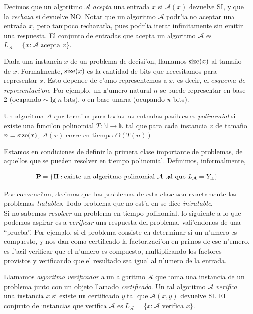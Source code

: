 Decimos que un algoritmo $\mathcal{A}$ \textit{acepta} una entrada $x$ si $\mathcal{A}(x)$ devuelve SI, y que la \textit{rechaza} si devuelve NO. Notar que un algoritmo $\mathcal{A}$ podr'ia no aceptar una entrada $x$, pero tampoco rechazarla, pues podr'ia iterar infinitamente sin emitir una respuesta. El conjunto de entradas que acepta un algoritmo $\mathcal{A}$ es $L_{\mathcal{A}} = \{x : \mathcal{A} \text{ acepta } x\}$.

Dada una instancia $x$ de un problema de decisi'on, llamamos $\textnormal{size}(x)$ al tama\~no de $x$. Formalmente, $\textnormal{size}(x)$ es la cantidad de bits que necesitamos para representar $x$. Esto depende de c'omo representemos a $x$, es decir, el \textit{esquema de representaci'on}. Por ejemplo, un n'umero natural $n$ se puede representar en base 2 (ocupando $\sim \lg n$ bits), o en base unaria (ocupando $n$ bits).

Un algoritmo $\mathcal{A}$ que termina para todas las entradas posibles es \textit{polinomial} si existe una funci'on polinomial $T : \mathbb{N} \to \mathbb{N}$ tal que para cada instancia $x$ de tama\~no $n = \textnormal{size}(x)$, $\mathcal{A}(x)$ corre en tiempo $O(T(n))$.

Estamos en condiciones de definir la primera clase importante de problemas, de aquellos que se pueden resolver en tiempo polinomial. Definimos, informalmente,

\[\textnormal{\textbf{P}} = \{\Pi : \text{existe un algoritmo polinomial } \mathcal{A} \text{ tal que } L_{\mathcal{A}} = Y_{\Pi}\}\]

\noindent
Por convenci'on, decimos que los problemas de esta clase son exactamente los problemas \textit{tratables}. Todo problema que no est'a en  se dice \textit{intratable}.\\

Si no sabemos \textit{resolver} un problema en tiempo polinomial, lo siguiente a lo que podemos aspirar es a \textit{verificar} una respuesta del problema, vali'endonos de una ``prueba''. Por ejemplo, si el problema consiste en determinar si un n'umero es compuesto, y nos dan como certificado la factorizaci'on en primos de ese n'umero, es f'acil verificar que el n'umero es compuesto, multiplicando los factores provistos y verificando que el resultado sea igual al n'umero de la entrada.

Llamamos \textit{algoritmo verificador} a un algoritmo $\mathcal{A}$ que toma una instancia de un problema junto con un objeto llamado \textit{certificado}. Un tal algoritmo $\mathcal{A}$ \textit{verifica} una instancia $x$ si existe un certificado $y$ tal que $\mathcal{A}(x, y)$ devuelve SI. El conjunto de instancias que verifica $\mathcal{A}$ es $L_{\mathcal{A}} = \{x : \mathcal{A} \text{ verifica } x\}$.

